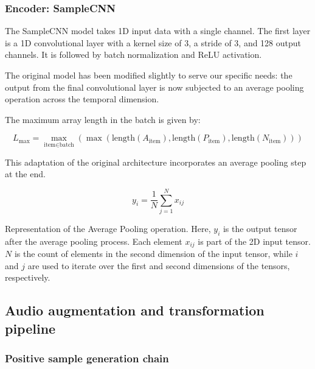 \subsubsection{Encoder: SampleCNN}

The SampleCNN model \cite{Lee2018SampleCNN:Classification} takes 1D input data with a single channel. The first layer is a 1D convolutional layer with a kernel size of 3, a stride of 3, and 128 output channels. It is followed by batch normalization and ReLU activation.

The original model has been modified slightly to serve our specific needs: the output from the final convolutional layer is now subjected to an average pooling operation across the temporal dimension.


The maximum array length in the batch is given by:

\begin{equation}
L_{\text{max}} = \max_{\text{item} \in \text{batch}}(\max(\text{length}(A_{\text{item}}), \text{length}(P_{\text{item}}), \text{length}(N_{\text{item}})))
\end{equation}

This adaptation of the original architecture incorporates an average pooling step at the end.


\begin{equation}
y_i = \frac{1}{N} \sum_{j=1}^{N} x_{ij}
\end{equation}

Representation of the Average Pooling operation. Here, $y_i$ is the output tensor after the average pooling process. Each element $x_{ij}$ is part of the 2D input tensor. $N$ is the count of elements in the second dimension of the input tensor, while $i$ and $j$ are used to iterate over the first and second dimensions of the tensors, respectively.







\subsection{Audio augmentation and transformation pipeline}

\subsubsection{Positive sample generation chain}

